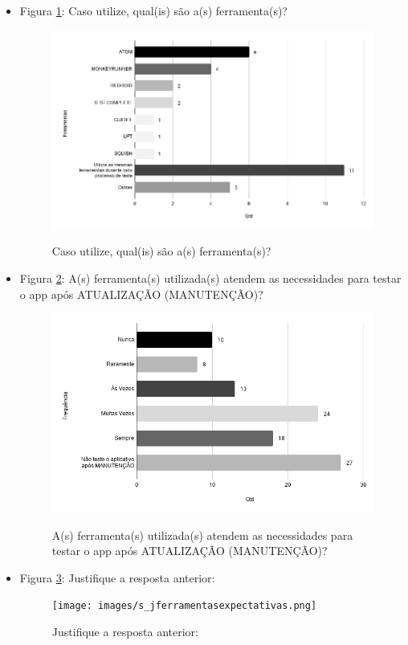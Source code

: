 \begin{itemize}
    
    \item Figura \ref{figure:s_ferramentastestenovo}: Caso utilize, qual(is) são a(s) ferramenta(s)?
    \begin{figure}[!htb]
    \centering
    \includegraphics[width=.80\textwidth]{images/s_ferramentastestenovo.png}
    \label{figure:s_ferramentastestenovo}
    \caption{Caso utilize, qual(is) são a(s) ferramenta(s)?}
    \end{figure}
    
    
    \item Figura \ref{figure:s_ferramentasexpectativas}: A(s) ferramenta(s) utilizada(s) atendem as necessidades para testar o app após ATUALIZAÇÃO (MANUTENÇÃO)?
    \begin{figure}[!htb]
    \centering
    \includegraphics[width=.80\textwidth]{images/s_ferramentasexpectativas.png}
    \label{figure:s_ferramentasexpectativas}
    \caption{A(s) ferramenta(s) utilizada(s) atendem as necessidades para testar o app após ATUALIZAÇÃO (MANUTENÇÃO)?}
    \end{figure}
    
    
    \item Figura \ref{figure:s_jferramentasexpectativas}: Justifique a resposta anterior:
    \begin{figure}[!htb]
    \centering
    \texttt{[image: images/s\_jferramentasexpectativas.png]}
    \label{figure:s_jferramentasexpectativas}
    \caption{Justifique a resposta anterior:}
    \end{figure}
    

\end{itemize}
